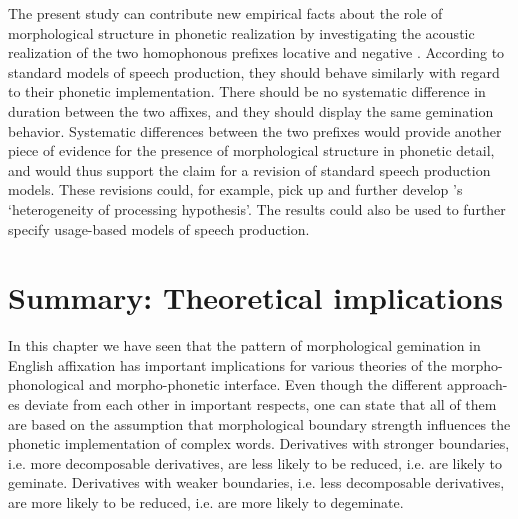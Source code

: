 { 

 
 
 The present study can contribute new empirical facts about the role of morphological structure in phonetic realization by investigating the acoustic realization of the two homophonous prefixes locative and negative . According to standard models of speech production, they should behave similarly with regard to their phonetic implementation. There should be no systematic difference in duration between the two affixes, and they should display the same gemination behavior. Systematic differences between the two prefixes would provide another piece of evidence for the presence of morphological structure in phonetic detail, and would thus support the claim for a revision of standard speech production models. These revisions could, for example, pick up and further develop \citeauthor{CohenGoldberg.2013}'s  `heterogeneity of processing hypothesis'. The results could also be used to further specify usage-based models of speech production.



 
 




\section{Summary: Theoretical implications}\label{summary predictions}

 In this chapter we have seen that the pattern of morphological gemination in English affixation has important implications for various theories of the morpho-phonological and morpho-phonetic interface. Even though the different approach-es deviate from each other in important respects, one can state that all of them are based on the assumption that morphological boundary strength influences the phonetic implementation of complex words. Derivatives with stronger boundaries, i.e. more decomposable derivatives, are less likely to be reduced, i.e. are likely to geminate. Derivatives with weaker boundaries, i.e. less decomposable derivatives, are more likely to be reduced, i.e. are more likely to degeminate. 
 

}
